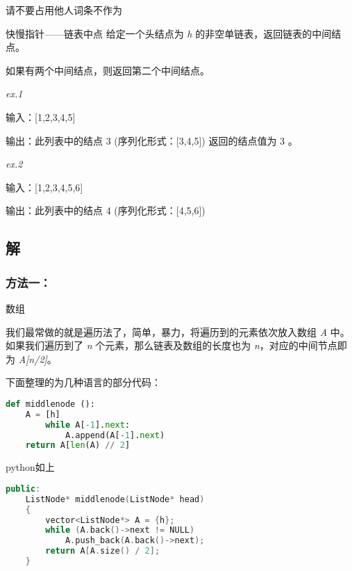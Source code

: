 
\begin{issues}
\issueDraft 请不要占用他人词条不作为
\end{issues}

\begin{example}{快慢指针——链表中点}
给定一个头结点为 \textsl{h} 的非空单链表，返回链表的中间结点。

如果有两个中间结点，则返回第二个中间结点。

\textsl{ex.1}

输入：[1,2,3,4,5] 

输出：此列表中的结点 3 (序列化形式：[3,4,5])
返回的结点值为 3 。

\textsl{ex.2}

输入：[1,2,3,4,5,6]

输出：此列表中的结点 4 (序列化形式：[4,5,6])
\end{example}

\subsection{解}
\subsubsection{方法一：}
数组

我们最常做的就是遍历法了，简单，暴力，将遍历到的元素依次放入数组 \textsl{A }中。如果我们遍历到了 \textsl{n }个元素，那么链表及数组的长度也为 \textsl{n}，对应的中间节点即为 \textsl{A[n/2]}。

下面整理的为几种语言的部分代码：
\begin{lstlisting}[language=python]
def middlenode ():
    A = [h]
        while A[-1].next:
            A.append(A[-1].next)
    return A[len(A) // 2]

\end{lstlisting}
python如上
\begin{lstlisting}[language=cpp]
public:
    ListNode* middlenode(ListNode* head) 
    {
        vector<ListNode*> A = {h};
        while (A.back()->next != NULL)
            A.push_back(A.back()->next);
        return A[A.size() / 2];
    }
\end{lstlisting}